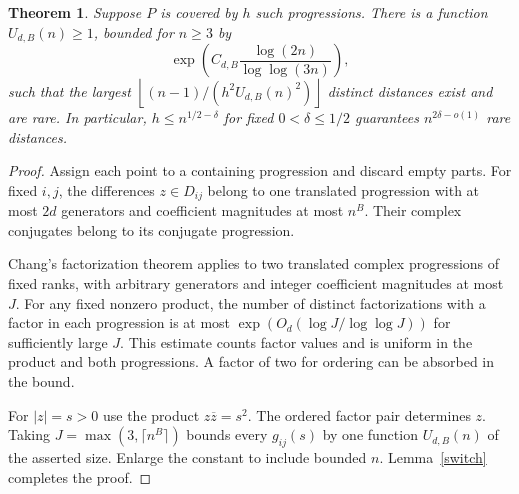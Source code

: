 \documentclass[10pt,letterpaper]{article}
\newtheorem{theorem}{Theorem}
\newcommand{\floor}[1]{\left\lfloor #1\right\rfloor}
\begin{document}
\begin{theorem}\label{cover}
Suppose $P$ is covered by $h$ such progressions. There is a function $U_{d,B}(n)\ge1$, bounded for $n\ge 3$ by
\[
 \exp\!\left(C_{d,B}\frac{\log(2n)}{\log\log(3n)}\right),
\]
such that the largest $\floor{(n-1)/(h^2U_{d,B}(n)^2)}$ distinct distances exist and are rare. In particular, $h\le n^{1/2-\delta}$ for fixed $0<\delta\le1/2$ guarantees $n^{2\delta-o(1)}$ rare distances.
\end{theorem}
\begin{proof}
Assign each point to a containing progression and discard empty parts. For fixed $i,j$, the differences $z\in D_{ij}$ belong to one translated progression with at most $2d$ generators and coefficient magnitudes at most $n^B$. Their complex conjugates belong to its conjugate progression.

Chang's factorization theorem \cite[proof of Proposition 3, equation (3.3)]{chang} applies to two translated complex progressions of fixed ranks, with arbitrary generators and integer coefficient magnitudes at most $J$. For any fixed nonzero product, the number of distinct factorizations with a factor in each progression is at most $\exp(O_d(\log J/\log\log J))$ for sufficiently large $J$. This estimate counts factor values and is uniform in the product and both progressions. A factor of two for ordering can be absorbed in the bound.

For $|z|=s>0$ use the product $z\overline z=s^2$. The ordered factor pair determines $z$. Taking $J=\max(3,\lceil n^B\rceil)$ bounds every $g_{ij}(s)$ by one function $U_{d,B}(n)$ of the asserted size. Enlarge the constant to include bounded $n$. Lemma~\ref{switch} completes the proof.
\end{proof}
\end{document}
